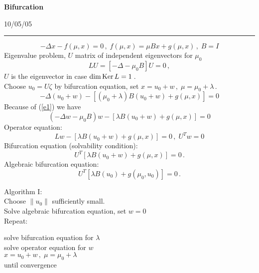 \documentclass[12pt,a4paper,twoside,leqno]{article}
\newcommand{\Release}{10/05/05} %
\begin{document}
{\large\bf Bifurcation}
\par
\vspace{-0.5ex}
\hfill{\footnotesize\Release\ }
\par\hrule\par\vspace{2ex}

{\large
\[
- \Delta x - f(\mu,x) = 0\,, \; f(\mu,x) = \mu B x + g(\mu,x)\,,\; B = I
\]
Eigenvalue problem, $U$ matrix of independent eigenvectors for $\mu_0$ 
\begin{equation}\label{e1}
L U = [- \Delta - \mu_0 B] U = 0\,, 
\end{equation}
%
$U$ is the eigenvector in case $\dim \mathop{\rm Ker}\nolimits L = 1$\,.\\  
Choose $u_0 = U\zeta$ by bifurcation equation, set 
$x = u_0 + w\,, \; \mu = \mu_0 + \lambda$\,. 
\[
-\Delta (u_0 + w) - [(\mu_0 + \lambda)B(u_0 + w) + g(\mu,x)] = 0
\]
Because of (\ref{e1}) we have
\[
(-\Delta w - \mu_0B)w -[\lambda B(u_0 + w) + g(\mu,x)] = 0
\]
Operator equation:
\[
Lw -[\lambda B(u_0 + w) + g(\mu,x)] = 0\,, \; U^Tw = 0
\]
Bifurcation equation (solvability condition):
\[
U^T[\lambda B(u_0 + w) + g(\mu,x)] = 0\,.
\]
Algebraic bifurcation equation:
\[
U^T[\lambda B(u_0) + g(\mu_0,u_0)] = 0\,.
\]


Algorithm I:\\
Choose $\|u_0\|$ sufficiently small.\\
Solve algebraic bifurcation equation, set $w = 0$\\

Repeat:

\hspace*{3ex} solve bifurcation equation for $\lambda$\\
\hspace*{3ex} solve operator equation for $w$\\
\hspace*{3ex} $x = u_0 + w\,, \; \mu = \mu_0 + \lambda$\\[1ex] 
%
until convergence
}
\end{document}
